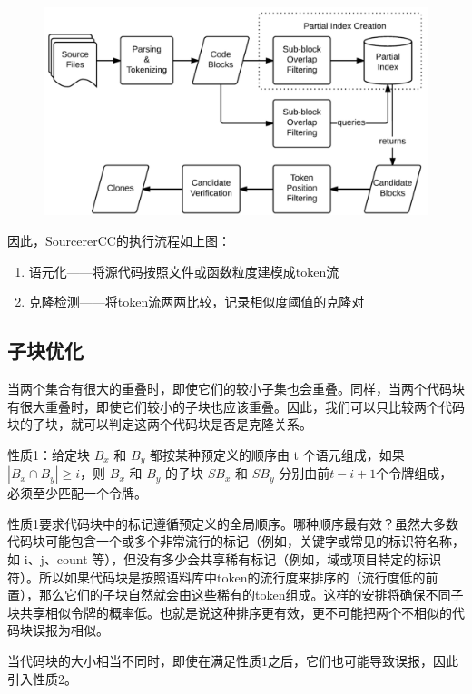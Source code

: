 \documentclass{cjc}
\begin{document}
\begin{figure}[htb]
  \centering
  \includegraphics[width=\linewidth]{pics/image.png}
\end{figure}

因此，SourcererCC的执行流程如上图：
\begin{enumerate}
    \item 语元化——将源代码按照文件或函数粒度建模成token流
    \item 克隆检测——将token流两两比较，记录相似度阈值的克隆对
\end{enumerate}

\subsection{子块优化}

当两个集合有很大的重叠时，即使它们的较小子集也会重叠。同样，当两个代码块有很大重叠时，即使它们较小的子块也应该重叠。因此，我们可以只比较两个代码块的子块，就可以判定这两个代码块是否是克隆关系。

性质1：给定块 $B_x$ 和 $B_y$ 都按某种预定义的顺序由 t 个语元组成，如果$ |B_x ∩B_y | ≥ i$，则 $B_x$ 和 $B_y$ 的子块 $SB_x$ 和 $SB_y$ 分别由前$ t - i + 1 $个令牌组成，必须至少匹配一个令牌。

性质1要求代码块中的标记遵循预定义的全局顺序。哪种顺序最有效？虽然大多数代码块可能包含一个或多个非常流行的标记（例如，关键字或常见的标识符名称，如 i、j、count 等），但没有多少会共享稀有标记（例如，域或项目特定的标识符）。所以如果代码块是按照语料库中token的流行度来排序的（流行度低的前置），那么它们的子块自然就会由这些稀有的token组成。这样的安排将确保不同子块共享相似令牌的概率低。也就是说这种排序更有效，更不可能把两个不相似的代码块误报为相似。

当代码块的大小相当不同时，即使在满足性质1之后，它们也可能导致误报，因此引入性质2。
\end{document}
